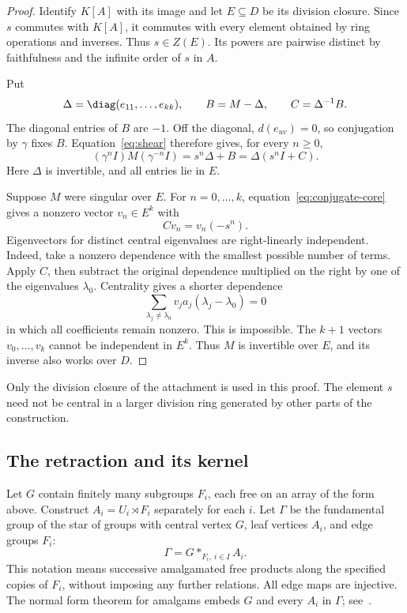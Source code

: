 \begin{proof}
Identify \(K[A]\) with its image and let \(E\subseteq D\) be its
division closure. Since \(s\) commutes with \(K[A]\), it commutes with
every element obtained by ring operations and inverses. Thus
\(s\in Z(E)\). Its powers are pairwise distinct by faithfulness and
the infinite order of \(s\) in \(A\).

Put
\[
 \Delta=\diag(e_{11},\ldots,e_{kk}),\qquad
 B=M-\Delta,\qquad C=\Delta^{-1}B.
\]
The diagonal entries of \(B\) are \(-1\). Off the diagonal,
\(d(e_{uv})=0\), so conjugation by \(\gamma\) fixes \(B\).
Equation~\eqref{eq:shear} therefore gives,
for every \(n\ge0\),
\begin{equation}\label{eq:conjugate-core}
 (\gamma^n I)M(\gamma^{-n}I)
 =s^n\Delta+B=\Delta(s^nI+C).
\end{equation}
Here \(\Delta\) is invertible, and all entries lie in \(E\).

Suppose \(M\) were singular over \(E\).
For \(n=0,\ldots,k\), equation~\eqref{eq:conjugate-core} gives a nonzero
vector \(v_n\in E^k\) with
\[
 Cv_n=v_n(-s^n).
\]
Eigenvectors for distinct central eigenvalues are right-linearly
independent. Indeed, take a nonzero dependence with the smallest
possible number of terms. Apply \(C\), then subtract the original
dependence multiplied on the right by one of the eigenvalues
\(\lambda_0\). Centrality gives a shorter dependence
\[
 \sum_{\lambda_j\ne\lambda_0}v_j a_j(\lambda_j-\lambda_0)=0
\]
in which all coefficients remain nonzero. This is impossible.
The \(k+1\) vectors \(v_0,\ldots,v_k\) cannot be independent in \(E^k\).
Thus \(M\) is invertible over \(E\), and its inverse also works over \(D\).
\end{proof}

Only the division closure of the attachment is used in this proof.
The element \(s\) need not be central in a larger division ring
generated by other parts of the construction.

\subsection{The retraction and its kernel}

Let \(G\) contain finitely many subgroups \(F_i\), each free on an
array of the form above. Construct \(A_i=U_i\rtimes F_i\) separately
for each \(i\). Let \(\Gamma\) be the fundamental group of the star
of groups with central vertex \(G\), leaf vertices \(A_i\), and edge
groups \(F_i\):
\begin{equation}\label{eq:star}
 \Gamma=G*_{F_i,\ i\in I}A_i.
\end{equation}
This notation means successive amalgamated free products along the
specified copies of \(F_i\), without imposing any further relations.
All edge maps are injective. The normal form theorem for amalgams
embeds \(G\) and every \(A_i\) in \(\Gamma\); see~\cite[Theorem~11 and Corollary~3 in I.5.2]{SerreTrees}.

